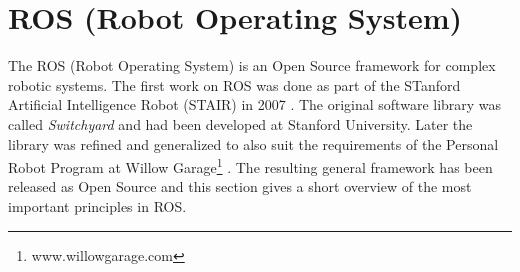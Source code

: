 


\section{ROS (Robot Operating System)}
\label{ros_overview}
The ROS (Robot Operating System) is an Open Source framework for complex robotic systems. The first work on ROS was done as part of the STanford Artificial Intelligence Robot (STAIR) in 2007 \cite{Quigley2007}. The original software library was called \emph{Switchyard} and had been developed at Stanford University. Later the library was refined and generalized to also suit the requirements of the Personal Robot Program at Willow Garage\footnote{www.willowgarage.com} \cite{Quigley2009}. The resulting general framework has been released as Open Source \cite{Quigley2009} and this section gives a short overview of the most important principles in ROS.

